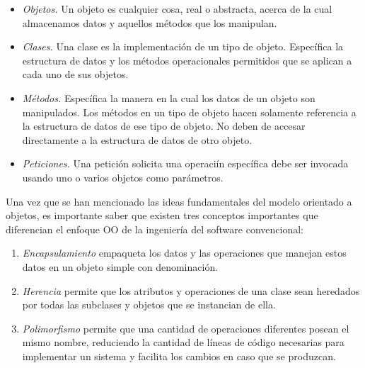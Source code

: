\documentclass[10pt,a4paper]{article}
\begin{document}
\begin{itemize}
\item \emph{Objetos.} Un objeto es cualquier cosa, real o abstracta, acerca de la cual almacenamos datos y aquellos m\'etodos que los manipulan.

\item \emph{Clases.} Una clase es la implementaci\'on de un tipo de objeto. Espec\'ifica la estructura de datos y los m\'etodos operacionales permitidos que se aplican a cada uno de sus objetos.

\item \emph{M\'etodos.} Espec\'ifica la manera en la cual los datos de un objeto son manipulados. Los m\'etodos en un tipo de objeto hacen solamente referencia a la estructura de datos de ese tipo de objeto. No deben de accesar directamente a la estructura de datos de otro objeto.

\item \emph{Peticiones.} Una petici\'on solicita una operaci\'in espec\'ifica debe ser invocada usando uno o varios objetos como par\'ametros.
\end{itemize}

Una vez que se han mencionado las ideas fundamentales del modelo orientado a objetos, es importante saber que existen tres conceptos importantes que diferencian el enfoque OO de la ingenier\'ia del software convencional:

\begin{enumerate}


\item \emph{Encapsulamiento} empaqueta los datos y las operaciones que manejan estos datos en un objeto simple con denominaci\'on.

\item \emph{Herencia} permite que los atributos y operaciones de una clase sean heredados por todas las subclases y objetos que se instancian de ella.

\item \emph{Polimorfismo} permite que una cantidad de operaciones diferentes posean el mismo nombre, reduciendo la cantidad de l\'ineas de c\'odigo necesarias para implementar un sistema y facilita los cambios en caso que se produzcan.

\end{enumerate}
\end{document}
